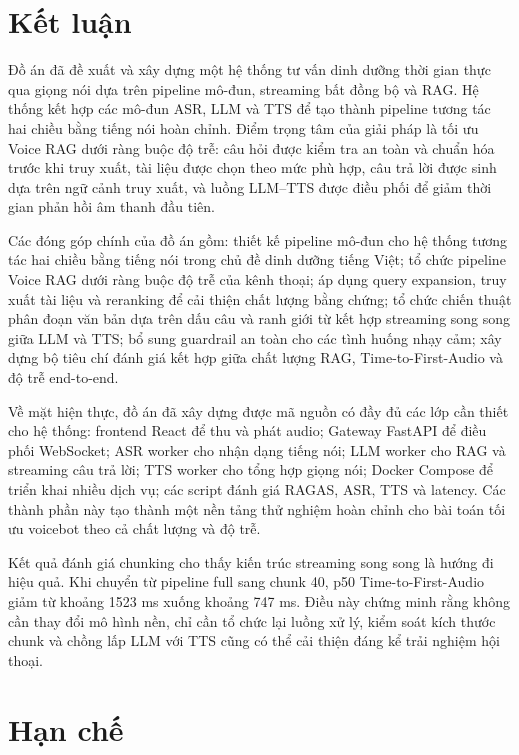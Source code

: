 \documentclass[a4paper,13pt,oneside]{report}
\begin{document}
\section{Kết luận}

Đồ án đã đề xuất và xây dựng một hệ thống tư vấn dinh dưỡng thời gian thực qua giọng nói dựa trên pipeline mô-đun, streaming bất đồng bộ và RAG. Hệ thống kết hợp các mô-đun ASR, LLM và TTS để tạo thành pipeline tương tác hai chiều bằng tiếng nói hoàn chỉnh. Điểm trọng tâm của giải pháp là tối ưu Voice RAG dưới ràng buộc độ trễ: câu hỏi được kiểm tra an toàn và chuẩn hóa trước khi truy xuất, tài liệu được chọn theo mức phù hợp, câu trả lời được sinh dựa trên ngữ cảnh truy xuất, và luồng LLM--TTS được điều phối để giảm thời gian phản hồi âm thanh đầu tiên.

Các đóng góp chính của đồ án gồm: thiết kế pipeline mô-đun cho hệ thống tương tác hai chiều bằng tiếng nói trong chủ đề dinh dưỡng tiếng Việt; tổ chức pipeline Voice RAG dưới ràng buộc độ trễ của kênh thoại; áp dụng query expansion, truy xuất tài liệu và reranking để cải thiện chất lượng bằng chứng; tổ chức chiến thuật phân đoạn văn bản dựa trên dấu câu và ranh giới từ kết hợp streaming song song giữa LLM và TTS; bổ sung guardrail an toàn cho các tình huống nhạy cảm; xây dựng bộ tiêu chí đánh giá kết hợp giữa chất lượng RAG, Time-to-First-Audio và độ trễ end-to-end.

Về mặt hiện thực, đồ án đã xây dựng được mã nguồn có đầy đủ các lớp cần thiết cho hệ thống: frontend React để thu và phát audio; Gateway FastAPI để điều phối WebSocket; ASR worker cho nhận dạng tiếng nói; LLM worker cho RAG và streaming câu trả lời; TTS worker cho tổng hợp giọng nói; Docker Compose để triển khai nhiều dịch vụ; các script đánh giá RAGAS, ASR, TTS và latency. Các thành phần này tạo thành một nền tảng thử nghiệm hoàn chỉnh cho bài toán tối ưu voicebot theo cả chất lượng và độ trễ.

Kết quả đánh giá chunking cho thấy kiến trúc streaming song song là hướng đi hiệu quả. Khi chuyển từ pipeline full sang chunk 40, p50 Time-to-First-Audio giảm từ khoảng 1523 ms xuống khoảng 747 ms. Điều này chứng minh rằng không cần thay đổi mô hình nền, chỉ cần tổ chức lại luồng xử lý, kiểm soát kích thước chunk và chồng lấp LLM với TTS cũng có thể cải thiện đáng kể trải nghiệm hội thoại.

\section{Hạn chế}
\end{document}
